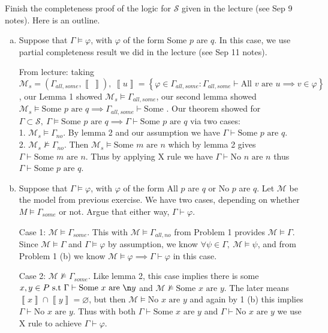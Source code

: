 \newpage
Finish the completeness proof of the logic for $\mathscr{S}$ given in the lecture (see Sep 9
notes). Here is an outline.

\begin{enumerate}[(a)]
	\item

Suppose that $\Gamma \vDash  \varphi $, with $\varphi $ of the form Some $p$ are $q$. In this case, we use
partial completeness result we did in the lecture (see Sep 11 notes).

From lecture: taking $\mathcal{M}_s = (\Gamma_{all,some} , \left\llbracket  \ \right\rrbracket ),\ \left\llbracket  u  \right\rrbracket = \left\{  \varphi \in   \Gamma_{all,some} :  \Gamma_{all,some} \vdash  \text{All } v \text{ are } u \implies  v \in  \varphi  \right\} $, our Lemma 1 showed $\mathcal{M}_s \vDash  \Gamma_{all,some} $, our second lemma showed $\mathcal{M}_s \vDash  \text{Some } p \text{ are } q \implies  \Gamma_{all,some} \vdash  \text{Some }$. Our theorem showed for $\Gamma  \subset \mathscr{S},\ \Gamma \vDash  \text{Some } p \text{ are } q \implies  \Gamma \vdash  \text{Some } p \text{ are } q $ via two cases:\\
1. $\mathcal{M}_s \vDash  \Gamma_{no}$. By lemma 2 and our assumption we have $\Gamma \vdash  \text{Some } p \text{ are } q $.\\
2. $\mathcal{M}_s \nvDash  \Gamma_{no}$. Then $\mathcal{M}_s \vDash  \text{Some } m \text{ are } n$ which by lemma 2 gives $\Gamma \vdash  \text{Some } m \text{ are } n$. Thus by applying X rule we have $\Gamma \vdash  \text{No } n \text{ are } n $ thus $\Gamma \vdash  \text{Some } p \text{ are } q $.
\item
	Suppose that $\Gamma  \vDash \varphi $, with $\varphi $ of the form All $p$ are $q$ or No $p$ are $q$. Let $\mathcal{M} $ be
the model from previous exercise. We have two cases, depending on whether
$M \vDash   \Gamma_{some}$ or not. Argue that either way, $\Gamma \vdash  \varphi $.

Case 1: $\mathcal{M} \vDash  \Gamma_{some}$. This with $\mathcal{M} \vDash  \Gamma_{all,no}$ from Problem 1 provides $\mathcal{M} \vDash  \Gamma $. Since $\mathcal{M} \vDash  \Gamma $ and $\Gamma \vDash  \varphi $ by assumption, we know $\forall \psi \in  \Gamma ,\ \mathcal{M} \vDash  \psi $, and from Problem 1 (b) we know $\mathcal{M} \vDash  \varphi \implies  \Gamma \vdash  \varphi $ in this case.

Case 2: $\mathcal{M} \nvDash  \Gamma_{some}.$ Like lemma 2, this case implies there is some $x,y \in  P \text{ s.t }  \Gamma \vdash  \text{Some } x \text{ are } \n y $ and $ \mathcal{M} \nvDash  \text{Some } x \text{ are } y $. The later means $\left\llbracket  x  \right\rrbracket \cap \left\llbracket  y  \right\rrbracket =\varnothing $, but then $\mathcal{M} \vDash  \text{No } x \text{ are } y $ and again by 1 (b) this implies $\Gamma \vdash  \text{No } x \text{ are } y $. Thus with both $\Gamma \vdash  \text{Some } x \text{ are } y $ and $\Gamma \vdash  \text{No } x \text{ are } y $ we use X rule to achieve $\Gamma \vdash  \varphi $.

\end{enumerate}
